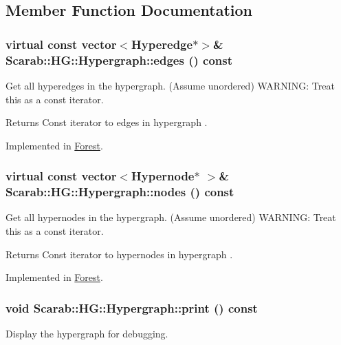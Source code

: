 \subsection{Member Function Documentation}
\hypertarget{classScarab_1_1HG_1_1Hypergraph_ac4f2f32e618d60d94a918a7bb1063666}{
\subsubsection[{edges}]{\setlength{\rightskip}{0pt plus 5cm}virtual const vector$<${\bf Hyperedge}$\ast$$>$\& Scarab::HG::Hypergraph::edges () const}}
\label{classScarab_1_1HG_1_1Hypergraph_ac4f2f32e618d60d94a918a7bb1063666}
Get all hyperedges in the hypergraph. (Assume unordered) WARNING: Treat this as a const iterator. \begin{DoxyReturn}{Returns}
Const iterator to edges in hypergraph . 
\end{DoxyReturn}


Implemented in \hyperlink{classForest_a02f4f789460750fe7e310a91b2365d96}{Forest}.

\hypertarget{classScarab_1_1HG_1_1Hypergraph_a9fc9b640b1b05bf3ce78a3bd941266ce}{
\subsubsection[{nodes}]{\setlength{\rightskip}{0pt plus 5cm}virtual const vector$<${\bf Hypernode}$\ast$ $>$\& Scarab::HG::Hypergraph::nodes () const}}
\label{classScarab_1_1HG_1_1Hypergraph_a9fc9b640b1b05bf3ce78a3bd941266ce}
Get all hypernodes in the hypergraph. (Assume unordered) WARNING: Treat this as a const iterator. \begin{DoxyReturn}{Returns}
Const iterator to hypernodes in hypergraph . 
\end{DoxyReturn}


Implemented in \hyperlink{classForest_a9b36063a664205e61ac86952c919a2bc}{Forest}.

\hypertarget{classScarab_1_1HG_1_1Hypergraph_a8976308c04be0b66d541e7c431550e9c}{
\subsubsection[{print}]{\setlength{\rightskip}{0pt plus 5cm}void Scarab::HG::Hypergraph::print () const}}
\label{classScarab_1_1HG_1_1Hypergraph_a8976308c04be0b66d541e7c431550e9c}
Display the hypergraph for debugging. 


